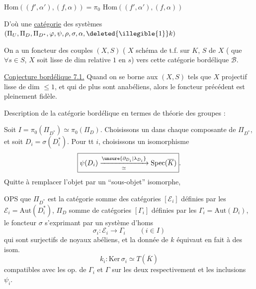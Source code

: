 $\mathrm{Hom}((f',\alpha'),(f,\alpha))=\pi_0$
\uline{$\mathrm{Hom}$}$((f',\alpha'),(f,\alpha))$

D'où une \uline{catégorie} des
 systèmes
$(\Pi_U,\Pi_D,\Pi_{D^*},\varphi,\psi,\rho,\sigma,\alpha,
\deleted{\illegible{1}}k)$


On a un foncteur des couples $(X,S)$
( $X$ schéma  de t.f. sur $K$,
$S$ 
  de $X$
 ( que $\forall s\in S$, $X$
soit lisse de dim relative $1$ en $s$)
vers cette catégorie bordélique $\mathcal B$.


\uline{Conjecture bordélique 7.1.}
Quand on se borne aux $(X,S)$ tels que $X$ projectif lisse de dim
$\leq 1$, et qui de plus sont anabéliens, alors le foncteur
précédent est pleinement fidèle.


Description de la catégorie bordélique en termes de théorie des groupes :

Soit $I=\pi_0(\Pi_{D^*})\simeq\pi_0(\Pi_D)$.
Choisissons un   dans chaque composante de
$\Pi_{D^*}$, et soit $D_i=\sigma(D_i^*)$.
Pour tt $i$, choisissons un isomorphisme
\[
\boxed{\psi(D_i)\xrightarrow[\simeq]{\unsure{\partial_{D_i}|\lambda_{D_i}}}
\mathrm{Spec}(\overline K)}.
\]
Quitte à remplacer l'objet par un ``sous-objet'' isomorphe,


OPS que $\Pi_{D^*}$ est la catégorie somme des catégories
$[\mathcal E_i]$ définies par les
$\mathcal E_i=\mathrm{Aut}(D_i^*)$, $\Pi_D$
 
somme de catégories $[\Gamma_i]$ définies par les
$\Gamma_i=\mathrm{Aut}(D_i)$, le foncteur $\sigma$ s'exprimant
par un système d'homs
\[
\sigma_i:\mathcal E_i\to\Gamma_i\qquad(i\in I)
\]
qui sont surjectifs de noyaux abéliens,
et la donnée de $k$ équivaut en fait à des isom.
\[
k_i:\mathrm{Ker}\,\sigma_i\simeq T(\overline K)
\]
compatibles avec les op. de $\Gamma_i$ et $\Gamma$ sur les deux
 respectivement et les inclusions $\psi_i$.

